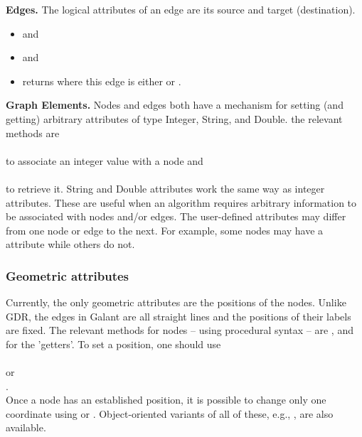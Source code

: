 \bigskip
\textbf{Edges.}
The logical attributes of an edge are its source and target (destination).

\begin{itemize}
\item
{} and 
\item
{} and 
\item
{} returns  where this edge is
either  or .
\end{itemize}

\bigskip
\textbf{Graph Elements.}
Nodes and edges both have a mechanism for setting (and getting)
arbitrary attributes of type Integer, String, and Double.
the relevant methods are\\
\\ 
to associate an integer value with a node and\\
\\
to retrieve it.
String and Double attributes work the same way as integer attributes.
These are useful when an algorithm requires arbitrary information to be
associated with nodes and/or edges.
The user-defined attributes may differ from one node or edge to the next.
For example, some nodes may have a  attribute while others do not.

\subsubsection{Geometric attributes}

Currently, the only geometric attributes are the positions of the
nodes. 
Unlike GDR, the edges in Galant
are all straight lines and the positions of their labels are fixed.
The relevant methods for nodes -- using procedural syntax -- are
, 
and 
for the 'getters'. To set a position,
one should use\\
\hspace*{2em}\\
or\\
\hspace*{2em}.\\
Once a node has an established position, it is possible to change
only one coordinate using  or .
Object-oriented variants of all of these, e.g.,
, are also available.

